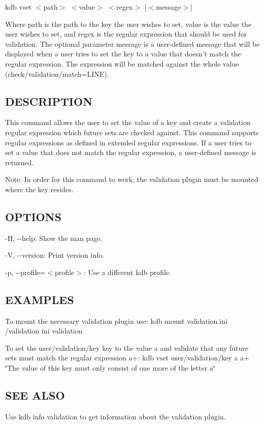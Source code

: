 {\ttfamily kdb vset $<$path$>$ $<$value$>$ $<$regex$>$ \mbox{[}$<$message$>$\mbox{]}}

Where {\ttfamily path} is the path to the key the user wishes to set, {\ttfamily value} is the value the user wishes to set, and {\ttfamily regex} is the regular expression that should be used for validation. The optional parameter {\ttfamily message} is a user-\/defined message that will be displayed when a user tries to set the key to a value that doesn't match the regular expression. The expression will be matched against the whole value ({\ttfamily check/validation/match=L\+I\+N\+E}).

\subsection*{D\+E\+S\+C\+R\+I\+P\+T\+I\+O\+N}

This command allows the user to set the value of a key and create a validation regular expression which future sets are checked against. This command supports regular expressions as defined in extended regular expressions. If a user tries to set a value that does not match the regular expression, a user-\/defined message is returned.

Note\+: In order for this command to work, the {\ttfamily validation} plugin must be mounted where the key resides.

\subsection*{O\+P\+T\+I\+O\+N\+S}


\begin{DoxyItemize}
\item {\ttfamily -\/\+H}, {\ttfamily -\/-\/help}\+: Show the man page.
\item {\ttfamily -\/\+V}, {\ttfamily -\/-\/version}\+: Print version info.
\item {\ttfamily -\/p}, {\ttfamily -\/-\/profile}=$<$profile$>$\+: Use a different kdb profile.
\end{DoxyItemize}

\subsection*{E\+X\+A\+M\+P\+L\+E\+S}

To mount the necessary validation plugin use\+: {\ttfamily kdb mount validation.\+ini /validation ini validation}

To set the {\ttfamily user/validation/key} key to the value {\ttfamily a} and validate that any future sets must match the regular expression {\ttfamily a+}\+: {\ttfamily kdb vset user/validation/key a a+ \char`\"{}\+The value of this key must only consist of one more of the letter a\char`\"{}}

\subsection*{S\+E\+E A\+L\+S\+O}


\begin{DoxyItemize}
\item Use {\ttfamily kdb info validation} to get information about the validation plugin. 
\end{DoxyItemize}